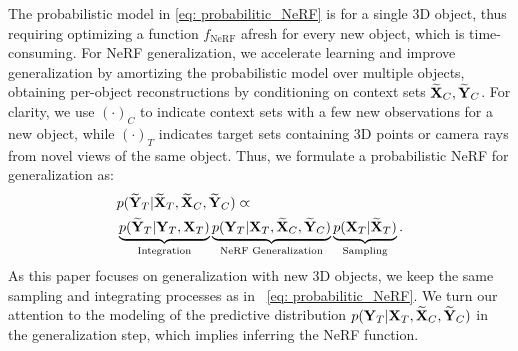 
The probabilistic model in \cref{eq: probabilitic_NeRF} is for a single 3D object, thus requiring optimizing a function $f_{\text{NeRF}}$ afresh for every new object, which is time-consuming. For NeRF generalization, we accelerate learning and improve generalization by amortizing the probabilistic model over multiple objects, obtaining per-object reconstructions by conditioning on context sets ${{\widetilde {\bf{X}}}_C, {\widetilde {\bf{Y}}}_C}$.
For clarity, we use ${(\cdot)}_{C}$ to indicate context sets with {a few new observations for a new object}, while ${(\cdot)}_{T}$ indicates target sets containing 3D points or camera rays from novel views of the same object.
Thus, we formulate a probabilistic NeRF for generalization as:
%
\begin{equation}
\begin{aligned}
    &p({\bf{\widetilde{Y}}}_{T} | {\bf{\widetilde{X}}}_{T}, {\bf{\widetilde{X}}}_{C}, {\bf{\widetilde{Y}}}_{C}) \varpropto \\
&    \underbrace{p({\bf{\widetilde{Y}}}_{T} | {\bf{{Y}}}_{T}, {\bf{{X}}}_{T})}_{\text{Integration}}
    \underbrace{p({\bf{{Y}}}_{T} | {\bf{{X}}}_{T}, {\bf{\widetilde{X}}}_{C}, {\bf{\widetilde{Y}}}_{C})}_{\text{NeRF Generalization}}
    \underbrace{p({\bf{{X}}}_{T} | {\bf{\widetilde{X}}}_{T})}_{\text{Sampling}}.
\end{aligned}
\label{eq: probabilitic_NeRF_generalization}
\end{equation}
%
As this paper focuses on generalization with new 3D objects, we keep the same sampling and integrating processes as in ~\cref{eq: probabilitic_NeRF}. We turn our attention to the modeling of the predictive distribution $p({\bf{{Y}}}_{T}| {\bf{{X}}}_{T}, {\bf{\widetilde{X}}}_{C}, {\bf{\widetilde{Y}}}_{C})$ in the generalization step, which implies inferring the NeRF function.

